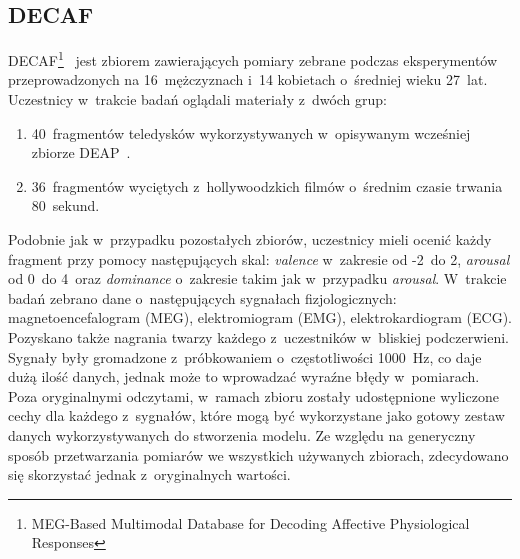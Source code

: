 \subsection{DECAF}
DECAF\footnote{MEG-Based Multimodal Database for Decoding Affective Physiological Responses}~\cite{decaf_dataset_2015} jest zbiorem zawierających pomiary zebrane podczas eksperymentów przeprowadzonych na 16~mężczyznach i~14 kobietach o~średniej wieku 27~lat. Uczestnicy w~trakcie badań oglądali materiały z~dwóch grup:
\begin{enumerate}
	\item  40~fragmentów teledysków wykorzystywanych w~opisywanym wcześniej zbiorze DEAP~\cite{deap_dataset_2011}.
	\item 36~fragmentów wyciętych z~hollywoodzkich filmów o~średnim czasie trwania 80~sekund.
\end{enumerate}
Podobnie jak w~przypadku pozostałych zbiorów, uczestnicy mieli ocenić każdy fragment przy pomocy następujących skal: \textit{valence} w~zakresie od -2~do 2, \textit{arousal} od 0~do 4~oraz \textit{dominance} o~zakresie takim jak w~przypadku \textit{arousal}. W~trakcie badań zebrano dane o~następujących sygnałach fizjologicznych: magnetoencefalogram (MEG), elektromiogram (EMG), elektrokardiogram (ECG). Pozyskano także nagrania twarzy każdego z~uczestników w~bliskiej podczerwieni. Sygnały były gromadzone z~próbkowaniem o~częstotliwości 1000~Hz, co daje dużą ilość danych, jednak może to wprowadzać wyraźne błędy w~pomiarach. Poza oryginalnymi odczytami, w~ramach zbioru zostały udostępnione wyliczone cechy dla każdego z~sygnałów, które mogą być wykorzystane jako gotowy zestaw danych wykorzystywanych do stworzenia modelu. Ze względu na generyczny sposób przetwarzania pomiarów we wszystkich używanych zbiorach, zdecydowano się skorzystać jednak z~oryginalnych wartości. 

